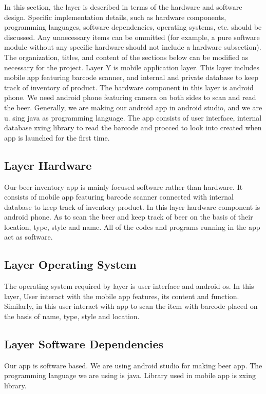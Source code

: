 In this section, the layer is described in terms of the hardware and software design. Specific implementation details, such as hardware components, programming languages, software dependencies, operating systems, etc. should be discussed. Any unnecessary items can be ommitted (for example, a pure software module without any specific hardware should not include a hardware subsection). The organization, titles, and content of the sections below can be modified as necessary for the project.
   Layer Y is mobile application layer. This layer includes mobile app featuring barcode scanner, and internal and private database to keep track of inventory of product. The hardware component in this layer is android phone. We need android phone featuring camera on both sides to scan and read the beer. Generally, we are making our android app in android studio, and we are u. sing java as programming language. The app consists of user interface, internal database zxing library to read the barcode and procced to look into created when app is launched for the first time.

\subsection{Layer Hardware}
Our beer inventory app is mainly focused software rather than hardware. It consists of mobile app featuring barcode scanner connected with internal database to keep track of inventory product. In this layer hardware component is android phone. As to scan the beer and keep track of beer on the basis of their location, type, style and name. All of the codes and programs running in the app act as software.

\subsection{Layer Operating System}
The operating system required by layer is user interface and android os. In this layer, User interact with the mobile app features, its content and function. Similarly, in this user interact with app to scan the item with barcode   placed on the basis of name, type, style and location. 

\subsection{Layer Software Dependencies}
Our app is software based. We are using android studio for making beer app. The programming language we are using is java. Library used in mobile app is zxing library.

